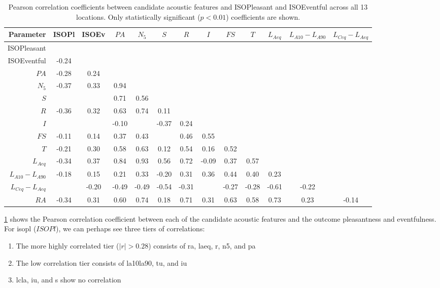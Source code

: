 \begin{table}
\centering
\caption{Pearson correlation coefficients between candidate acoustic features and ISOPleasant and ISOEventful across all 13 locations. Only statistically significant ($p < 0.01$) coefficients are shown. \label{tab:corr}}
\begin{tabular}{r|cccccccccccc} 
\toprule
\textbf{Parameter} & ISOPl & ISOEv & $PA$ & $N_5$ & $S$ & $R$ & $I$ & $FS$ & $T$ & $L_{Aeq}$ & $L_{A10}-L_{A90}$ & $L_{Ceq}-L_{Aeq}$ \\ 
\midrule
ISOPleasant &  &  &  &  &  &  &  &  &  &  &  &  \\
ISOEventful & -0.24 &  &  &  &  &  &  &  &  &  &  &  \\
$PA$ & -0.28 & 0.24 &  &  &  &  &  &  &  &  &  &  \\
$N_5$ & -0.37 & 0.33 & 0.94 &  &  &  &  &  &  &  &  &  \\
$S$ &  &  & 0.71 & 0.56 &  &  &  &  &  &  &  &  \\
$R$ & -0.36 & 0.32 & 0.63 & 0.74 & 0.11 &  &  &  &  &  &  &  \\
$I$ &  &  & -0.10 &  & -0.37 & 0.24 &  &  &  &  &  &  \\
$FS$ & -0.11 & 0.14 & 0.37 & 0.43 &  & 0.46 & 0.55 &  &  &  &  &  \\
$T$ & -0.21 & 0.30 & 0.58 & 0.63 & 0.12 & 0.54 & 0.16 & 0.52 &  &  &  &  \\
$L_{Aeq}$ & -0.34 & 0.37 & 0.84 & 0.93 & 0.56 & 0.72 & -0.09 & 0.37 & 0.57 &  &  &  \\
$L_{A10}-L_{A90}$ & -0.18 & 0.15 & 0.21 & 0.33 & -0.20 & 0.31 & 0.36 & 0.44 & 0.40 & 0.23 &  &  \\
$L_{Ceq}-L_{Aeq}$ &  & -0.20 & -0.49 & -0.49 & -0.54 & -0.31 &  & -0.27 & -0.28 & -0.61 & -0.22 &  \\
$RA$ & -0.34 & 0.31 & 0.60 & 0.74 & 0.18 & 0.71 & 0.31 & 0.63 & 0.58 & 0.73 & 0.23 & -0.14 \\
\bottomrule
\end{tabular}
\end{table}


   \cref{tab:corr} shows the Pearson correlation coefficient between each of the candidate acoustic features and the outcome pleasantness and eventfulness. For \gls{isopl} ($ISOPl$), we can perhaps see three tiers of correlations:

   \begin{enumerate}
     \item The more highly correlated tier ($|r| > 0.28$) consists of \gls{ra}, \gls{laeq}, \gls{r}, \gls{n5}, and \gls{pa}
     \item The low correlation tier consists of \gls{la10la90}, \gls{tu}, and \gls{iu}
     \item \gls{lcla}, \gls{iu}, and \gls{s} show no correlation
   \end{enumerate}

